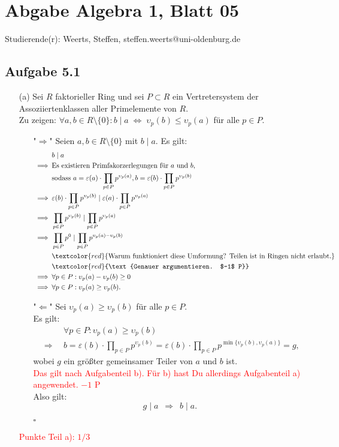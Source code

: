 \documentclass[12pt]{article}
\newcommand{\corr}[1]{\textcolor{red}{#1}}
\newcommand{\QED}{\begin{flushright} $\square$ \end{flushright}}
\newcommand{\df}{\enspace\Longrightarrow\enspace}
\newcommand{\gdw}{\;\Longleftrightarrow\;}
\begin{document}
\section*{Abgabe Algebra 1, Blatt 05}

Studierende(r): Weerts, Steffen, steffen.weerts@uni-oldenburg.de

\subsection*{Aufgabe 5.1}
\begin{enumerate}
	\item[(a)] Sei $R$ faktorieller Ring und sei $P\subset R$ ein Vertretersystem der Assoziiertenklassen aller Primelemente von $R$. \\
	Zu zeigen: $\forall a,b\in R\setminus\{0\}:b\mid a \gdw \upsilon_p(b)\leq\upsilon_p(a)$ für alle $p\in P$. \\
	\begin{enumerate}
		\item["$\Longrightarrow$"] Seien $a,b\in R\setminus\{0\}$ mit $b\mid a$. Es gilt:
		\begin{align*}
			&b\mid a \\
			\df &\text{Es existieren Primfakorzerlegungen für $a$ und $b$,} \\
			&\text{sodass }a=\varepsilon(a)\cdot\prod_{p\in P}p^{\upsilon_p(a)},b=\varepsilon(b)\cdot\prod_{p\in P}p^{\upsilon_p(b)} \\
			\df &\varepsilon(b)\cdot\prod_{p\in P}p^{\upsilon_p(b)} \mid \varepsilon(a)\cdot\prod_{p\in P}p^{\upsilon_p(a)} \\
			\df &\prod_{p\in P}p^{\upsilon_p(b)} \mid \prod_{p\in P}p^{\upsilon_p(a)} \\
			\df &\prod_{p\in P}p^{0} \mid \prod_{p\in P}p^{\upsilon_p(a)-\upsilon_p(b)} \\
&\corr{\text{Warum funktioniert diese Umformung? Teilen ist in Ringen nicht erlaubt.}}\\
&\corr{\text{Genauer argumentieren. $-1$ P}}\\
			\df &\forall p\in P:\upsilon_p(a)-\upsilon_p(b)\geq 0 \\
			\df &\forall p\in P:\upsilon_p(a)\geq\upsilon_p(b).
		\end{align*}
		
		\item["$\Longleftarrow$"] Sei $\upsilon_p(a)\geq\upsilon_p(b)$ für alle $p\in P$. \\
		Es gilt:
		\begin{align*}
			&\forall p\in P:\upsilon_p(a)\geq\upsilon_p(b) \\
			\df &b=\varepsilon(b)\cdot\prod_{p\in P}p^{\upsilon_p(b)}=\varepsilon(b)\cdot\prod_{p\in P}p^{\min\{\upsilon_p(b),\upsilon_p(a)\}}=g,
		\end{align*}
		wobei $g$ ein größter gemeinsamer Teiler von $a$ und $b$ ist.\\
\corr{Das gilt nach Aufgabenteil b). Für b) hast Du allerdings Aufgabenteil a) angewendet. $-1$ P}\\
		Also gilt: $$g\mid a \df b\mid a.$$
		\QED
	\end{enumerate}
\corr{Punkte Teil a): $1/3$}
	

\end{enumerate}
\end{document}
